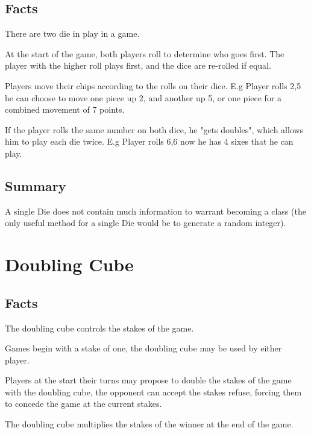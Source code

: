 \documentclass{report}
\begin{document}
\subsection{Facts}

\begin{dashed}
    \item There are two die in play in a game.
    \item At the start of the game, both players roll to determine who goes first.
        The player with the higher roll plays first, and the dice are re-rolled if equal.
    \item Players move their chips according to the rolls on their dice.
        E.g Player rolls 2,5 he can choose to move one piece up 2, and another up 5,
        or one piece for a combined movement of 7 points.
    \item If the player rolls the same number on both dice, he "gets doubles", which
        allows him to play each die twice.
        E.g Player rolls 6,6 now he has 4 sixes that he can play.
\end{dashed}

\subsection{Summary}

A single Die does not contain much information to warrant becoming a class (the
only useful method for a single Die would be to generate a random integer).

\section{Doubling Cube}

\subsection{Facts}

\begin{dashed}
    \item The doubling cube controls the stakes of the game.
    \item Games begin with a stake of one, the doubling cube may be used by either player.
    \item Players at the start their turns may propose to double the stakes of the game
        with the doubling cube, the opponent can accept the stakes refuse, forcing them
        to concede the game at the current stakes.
    \item The doubling cube multiplies the stakes of the winner at the end of the game.
\end{dashed}
\end{document}
